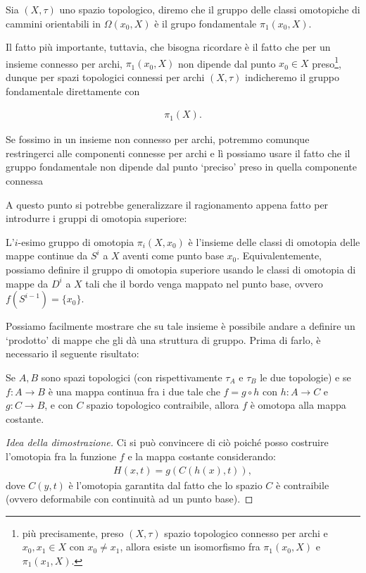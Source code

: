 \begin{definition}
    Sia $(X, \tau)$ uno spazio topologico, diremo che il gruppo delle classi omotopiche di cammini orientabili in $\Omega(x_0, X)$ è il grupo fondamentale $\pi_1(x_0, X)$.  
\end{definition}

Il fatto più importante, tuttavia, che bisogna ricordare è il fatto che per un insieme connesso per archi, $\pi_1(x_0, X)$ non dipende dal punto $x_0 \in X$ preso\footnote{più precisamente, preso $(X, \tau)$ spazio topologico connesso per archi e $x_0, x_1 \in X$ con $x_0 \neq x_1$, allora esiste un isomorfismo
fra $\pi_1(x_0, X)$ e $\pi_1(x_1, X)$.}, dunque per spazi topologici connessi per archi $(X, \tau)$ indicheremo il gruppo fondamentale direttamente con

\begin{align}
    \pi_1(X).
\end{align}

\begin{remark}
    Se fossimo in un insieme non connesso per archi, potremmo comunque restringerci alle componenti connesse per archi e lì possiamo usare il fatto che il gruppo fondamentale non dipende dal punto `preciso' preso in quella componente connessa
\end{remark}

A questo punto si potrebbe generalizzare il ragionamento appena fatto per introdurre i gruppi di omotopia superiore:
\begin{definition}
    L'$i$-esimo gruppo di omotopia $\pi_i(X, x_0)$ è l'insieme delle classi di omotopia delle mappe continue da $S^i$ a $X$ aventi come punto base $x_0$. Equivalentemente, possiamo definire il gruppo di omotopia superiore usando le classi di omotopia di mappe da $D^i$ a $X$ tali che il bordo venga mappato nel punto base, ovvero $f(S^{i-1}) = \{x_0\}$.
\end{definition}

Possiamo facilmente mostrare che su tale insieme è possibile andare a definire un `prodotto' di mappe che gli dà una struttura di gruppo. Prima di farlo, è necessario il seguente risultato:

\begin{theorem}
    Se $A, B$ sono spazi topologici (con rispettivamente $\tau_A$ e $\tau_B$ le due topologie) e se $f: A \to B$ è una mappa continua fra i due tale che $f = g \circ h$ con $h: A \to C$ e $g: C \to B$, e con $C$ spazio topologico contraibile, allora $f$ è omotopa alla mappa costante.
\end{theorem}
\begin{proof}[Idea della dimostrazione]
    Ci si può convincere di ciò poiché posso costruire l'omotopia fra la funzione $f$ e la mappa costante considerando:
    \begin{align}
        H(x, t) = g(C(h(x), t)),
    \end{align}
    dove $C(y, t)$ è l'omotopia garantita dal fatto che lo spazio $C$ è contraibile (ovvero deformabile con continuità ad un punto base).
\end{proof}

